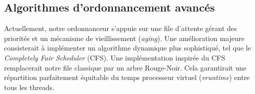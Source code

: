 \subsection{Algorithmes d'ordonnancement avancés}

Actuellement, notre ordonnanceur s'appuie sur une file d'attente gérant des priorités et un mécanisme de vieillissement (\textit{aging}). Une amélioration majeure consisterait à implémenter un algorithme dynamique plus sophistiqué, tel que le \textit{Completely Fair Scheduler} (CFS). Une implémentation inspirée du CFS  remplacerait notre file classique par un arbre Rouge-Noir. Cela garantirait une répartition parfaitement 
équitable du temps processeur virtuel (\textit{vruntime}) entre tous les threads.
